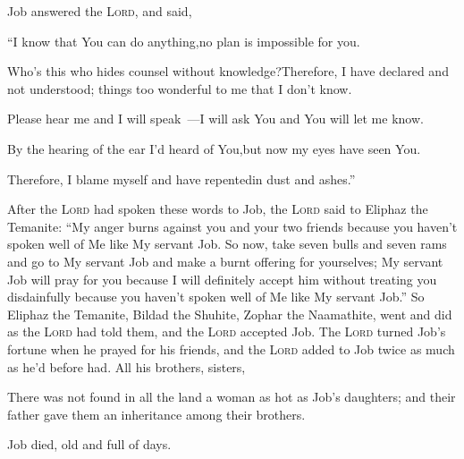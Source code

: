 
\begin{inparaenum}
   Job answered the \textsc{Lord}, and said,\smallskip%
  
  \pb {} ``I know that You can do anything,\pa no plan is impossible for you.%
  
  \pb {} Who's this who hides counsel without knowledge?\pa Therefore, I have declared and not understood; things too wonderful to me that I don't know.%
  
  \pb {} Please hear me and I will speak~---\pa I will ask You and You will let me know.%
  
  \pb {} By the hearing of the ear I'd heard of You,\pa but now my eyes have seen You.%
  
  \pb {} Therefore, I blame myself and have repented\pa in dust and ashes.''\smallskip%
  
   After the \textsc{Lord} had spoken these words to Job, the \textsc{Lord} said to Eliphaz the Temanite: ``My anger burns against you and your two friends because you haven't spoken well of Me like My servant Job.%
   So now, take seven bulls and seven rams and go to My servant Job and make a burnt offering for yourselves; My servant Job will pray for you because I will definitely accept him without treating you disdainfully because you haven't spoken well of Me like My servant Job.''%
   So Eliphaz the Temanite, Bildad the Shuhite, Zophar the Naamathite, went and did as the \textsc{Lord} had told them, and the \textsc{Lord} accepted Job.%
   The \textsc{Lord} turned Job's fortune when he prayed for his friends, and the \textsc{Lord} added to Job twice as much as he'd before had.%
   All his brothers, sisters, %
  
   There was not found in all the land a woman as hot as Job's daughters; and their father gave them an inheritance among their brothers.%
  
   Job died, old and full of days.%
\end{inparaenum}

